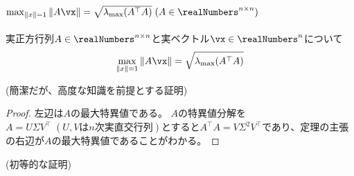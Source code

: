         \subsection{\texorpdfstring{$\max_{\|x\|=1} \|A\vx\| = \sqrt{\lambda_{\text{max}}(A^\top A)}\;(A\in\realNumbers^{n\times n})$}{max\_\{||x||=1\} ||Ax|| = sqrt(λ\_max(A\string^⊤ A)) (A∈R\string^(n×n))}}
            \begin{shadebox}
                実正方行列$A \in \realNumbers^{n\times n}$と実ベクトル$\vx \in \realNumbers^n$について
                \[\max_{\|x\|=1} \|A\vx\| = \sqrt{\lambda_{\text{max}}(A^\top A)}\]
            \end{shadebox}
            \noindent
            (簡潔だが、高度な知識を前提とする証明)
            \begin{proof}
                左辺は$A$の最大特異値である。
                $A$の特異値分解を$A=U\Sigma V^\top\;(U,V\text{は}n\text{次実直交行列})$とすると$A^\top A = V\Sigma^2V^\top$であり、定理の主張の右辺が$A$の最大特異値であることがわかる。
            \end{proof}
            \noindent
            (初等的な証明)

